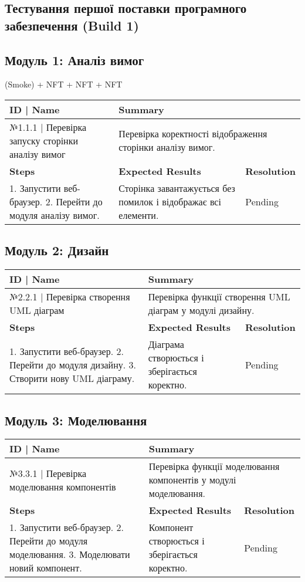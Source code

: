 \documentclass[oneside,14pt]{extarticle}
\begin{document}
\begin{normalsize}
	\section*{Тестування першої поставки програмного забезпечення (Build 1)}
	\subsection*{Модуль 1: Аналіз вимог}
	(Smoke) + NFT + NFT + NFT
	\begin{longtable}{|p{7cm}|p{3.5cm}|p{3.5cm}|}
		\hline
		\textbf{ID | Name} & \multicolumn{2}{|p{7cm}|}{\textbf{Summary}}
		\\\hline
		№1.1.1 | Перевірка запуску сторінки аналізу вимог & \multicolumn{2}{|p{7cm}|}{Перевірка коректності відображення сторінки аналізу вимог.}
		\\\hline
		\textbf{Steps} & \textbf{Expected Results} & \textbf{Resolution}
		\\\hline
		1. Запустити веб-браузер. 2. Перейти до модуля аналізу вимог.
		& Сторінка завантажується без помилок і відображає всі елементи.
		& Pending
		\\\hline
	\end{longtable}
	
	\subsection*{Модуль 2: Дизайн}
	\begin{longtable}{|p{7cm}|p{3.5cm}|p{3.5cm}|}
		\hline
		\textbf{ID | Name} & \multicolumn{2}{|p{7cm}|}{\textbf{Summary}}
		\\\hline
		№2.2.1 | Перевірка створення UML діаграм & \multicolumn{2}{|p{7cm}|}{Перевірка функції створення UML діаграм у модулі дизайну.}
		\\\hline
		\textbf{Steps} & \textbf{Expected Results} & \textbf{Resolution}
		\\\hline
		1. Запустити веб-браузер. 2. Перейти до модуля дизайну. 3. Створити нову UML діаграму.
		& Діаграма створюється і зберігається коректно.
		& Pending
		\\\hline
	\end{longtable}
	
	\subsection*{Модуль 3: Моделювання}
	\begin{longtable}{|p{7cm}|p{3.5cm}|p{3.5cm}|}
		\hline
		\textbf{ID | Name} & \multicolumn{2}{|p{7cm}|}{\textbf{Summary}}
		\\\hline
		№3.3.1 | Перевірка моделювання компонентів & \multicolumn{2}{|p{7cm}|}{Перевірка функції моделювання компонентів у модулі моделювання.}
		\\\hline
		\textbf{Steps} & \textbf{Expected Results} & \textbf{Resolution}
		\\\hline
		1. Запустити веб-браузер. 2. Перейти до модуля моделювання. 3. Моделювати новий компонент.
		& Компонент створюється і зберігається коректно.
		& Pending
		\\\hline
	\end{longtable}
	

\end{normalsize}
\end{document}
